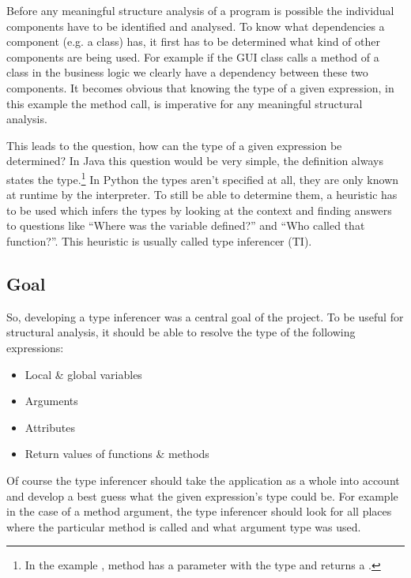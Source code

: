 \documentclass[12pt,halfparskip]{scrreprt}
\begin{document}
Before any meaningful structure analysis of a program is possible the individual components have to be identified and analysed. To know what dependencies a component (e.g. a class) has, it first has to be determined what kind of other components are being used. For example if the GUI class calls a method of a class in the business logic we clearly have a dependency between these two components. It becomes obvious that knowing the type of a given expression, in this example the method call, is imperative for any meaningful structural analysis.

This leads to the question, how can the type of a given expression be determined? In Java this question would be very simple, the definition always states the type.\footnote{In the example , method  has a parameter  with the type  and returns a .} In Python the types aren't specified at all, they are only known at runtime by the interpreter. To still be able to determine them, a heuristic has to be used which infers the types by looking at the context and finding answers to questions like ``Where was the variable defined?'' and ``Who called that function?''. This heuristic is usually called type inferencer (TI).

\subsection{Goal}


So, developing a type inferencer was a central goal of the project. To be useful for structural analysis, it should be able to resolve the type of the following expressions:

\begin{itemize}
	\item Local \& global variables
	\item Arguments
	\item Attributes
	\item Return values of functions \& methods
\end{itemize}

Of course the type inferencer should take the application as a whole into account and develop a best guess what the given expression's type could be. For example in the case of a method argument, the type inferencer should look for all places where the particular method is called and what argument type was used.
\end{document}
